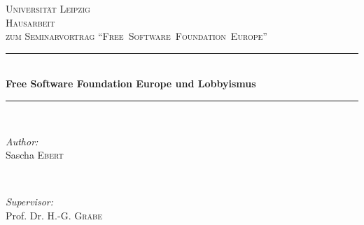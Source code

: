 \begin{titlepage}

\newcommand{\HRule}{\rule{\linewidth}{0.5mm}} %

\center %


\textsc{\LARGE Universität Leipzig}\\[1.5cm] %
\textsc{\Large Hausarbeit}\\[0.5cm] %
\textsc{\large zum Seminarvortrag ``Free~Software~Foundation~Europe''}\\[0.5cm] 
% 


\HRule \\[0.4cm]
{ \LARGE \bfseries Free Software Foundation Europe und Lobbyismus}\\[0.4cm]
\HRule \\[1.5cm]


\begin{minipage}{0.4\textwidth}
\begin{flushleft} \large
\emph{Author:}\\
Sascha \textsc{Ebert} %
\end{flushleft}
\end{minipage}
~
\begin{minipage}{0.4\textwidth}
\begin{flushright} \large
\emph{Supervisor:} \\
Prof. Dr. H.-G. \textsc{Gräbe} %
\end{flushright}
\end{minipage}\\[4cm]



\end{titlepage}
